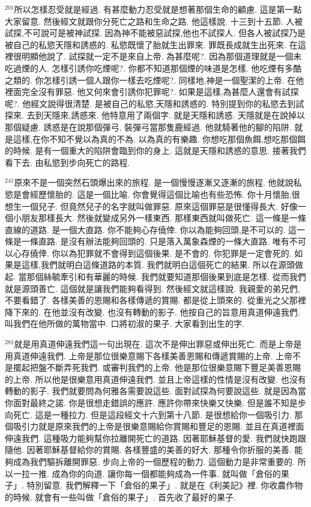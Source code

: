 \documentclass{book}
\begin{document}
$^{201}$所以怎樣忍受就是經過.
有甚麼動力忍受就是想著那個生命的顧慮.
這是第一點大家留意.
然後經文就跟你分死亡之路和生命之路.
他這樣說.
十三到十五節.
人被試探,不可說可是被神試探.
因為神不能被惡試探,他也不試探人.
但各人被試探乃是被自己的私慾天隱和誘惑的.
私慾既懷了胎就生出罪來.
罪既長成就生出死來.
在這裡很明顯他說了.
試探就一定不是來自上帝.
為甚麼呢?.
因為那個道理就是一個未吃過煙的人.
怎樣引誘你吃煙呢?.
你都不知道那個煙的味道是怎樣.
他吃煙有多酷之類的.
你怎樣引誘一個人跟你一樣去吃煙呢?.
同樣地,神是一個聖潔的上帝.
在他裡面完全沒有罪惡.
他又何來會引誘你犯罪呢?.
如果是這樣,為甚麼人還會有試探呢?.
他經文說得很清楚.
是被自己的私慾,天隱和誘惑的.
特別提到你的私慾去到試探來.
去到天隱來,誘惑來.
他特意用了兩個字.
就是天隱和誘惑.
天隱就是在說掉以那個疑慮.
誘惑是在說那個彈弓.
裝彈弓當那隻鹿經過.
他就騎著他的腳的陷阱.
就是這樣,在你不知不覺以為真的不為.
以為真的有樂趣.
你想吃那個魚餌,想吃那個餌的時候.
是有一個重大的陷阱會臨到你的身上.
這就是天隱和誘惑的意思.
接著我們看下去.
由私慾到步向死亡的路程.

$^{241}$原來不是一個突然石頭爆出來的旅程.
是一個慢慢逐漸又逐漸的旅程.
他就說私慾是會經歷懷胎的.
這是一個比喻.
你會覺得這個比喻也有些恐怖.
你十月懷胎,很想生一個兒子.
但竟然兒子的名字就叫做罪惡.
原來這個罪惡是很懂得長大.
好像一個小朋友那樣長大.
然後就變成另外一樣東西.
那樣東西就叫做死亡.
這一條是一條直線的道路.
是一個大直路.
你不能夠心存僥倖.
你以為能夠回頭,是不可以的.
這一條是一條直路.
是沒有辦法能夠回頭的.
只是落入萬象森煙的一條大直路.
唯有不可以心存僥倖.
你以為犯罪就不會得到這個後果.
是不會的.
你犯罪是一定會死的.
如果是這樣,我們就明白這條道路的本質.
我們就明白這個死亡的結果.
所以在源頭做起.
當那個絲毓牽引和有華麗的時候.
我們就要知道那個後果到底是怎樣.
從而我們就是源頭善亡.
這個就是讓我們能夠看得到.
然後經文就這樣說.
我親愛的弟兄們,不要看錯了.
各樣美善的恩賜和各樣傳遞的賞賜.
都是從上頭來的.
從重光之父那裡降下來的.
在他並沒有改變.
也沒有轉動的影子.
他按自己的旨意用真道伸遠我們.
叫我們在他所做的萬物當中.
口將初淑的果子.
大家看到出生的字.

$^{281}$就是用真道伸遠我們這一句出現在.
這次不是伸出罪惡或伸出死亡.
而是上帝是用真道伸遠我們.
上帝是那位很樂意賜下各樣美善恩賜和傳遞賞賜的上帝.
上帝不是擺起把盤不斷弄死我們.
或審判我們的上帝.
他是那位很樂意賜下豐足美善恩賜的上帝.
所以他是很樂意用真道伸遠我們.
並且上帝這樣的性情是沒有改變.
也沒有轉動的影子.
我們就要問為何雅各需要說這些.
面對試探為何要說這些.
就是因為當你面對最終之諾.
你是很想走錯誤的應許.
應許你帶來快樂又快樂.
但是誰不知是步向死亡.
這是一種拉力.
但是這段經文十六到第十八節.
是很想給你一個吸引力.
那個吸引力就是原來我們的上帝是很樂意賜給你賞賜和豐足的恩賜.
並且在真道裡面伸遠我們.
這種吸力能夠幫你拉離開死亡的道路.
因著耶穌基督的愛.
我們就快跑跟隨他.
因著耶穌基督給你的賞賜.
各樣豐盛的美善的好大.
那種令你折服的美善.
能夠成為我們驅拆離開罪惡.
步向上帝的一個歷程的動力.
這個動力是非常重要的.
所以一拉一推.
成為你的向道.
讓你每一個都能夠成為一件事.
就叫做「倉俗的果子」.
特別留意.
我們解釋一下「倉俗的果子」.
就是在《利美記》裡.
你收農作物的時候.
就會有一些叫做「倉俗的果子」.
首先收了最好的果子.
\end{document}
